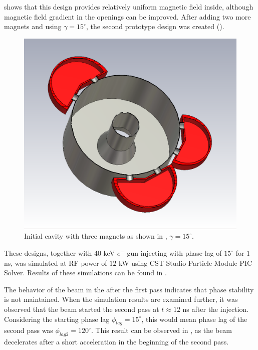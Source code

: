 \documentclass[a4paper,oneside,12pt]{report}
\numberwithin{equation}{chapter}
\begin{document}
 shows that this design provides relatively uniform magnetic field inside, although magnetic field gradient in the openings can be improved.
After adding two more magnets and using $\gamma=15^\circ$, the second prototype design was created ().

\vspace{20pt}
\begin{figure}[H]
    \centering
    \includegraphics[width=.6\linewidth]{./figures/cst/cst_second_design2.png}
    \vspace{0pt}
    \caption{Initial cavity with three magnets as shown in , $\gamma=15^\circ$.}
    \label{fig:initial_three_magnet_design}
    \vspace{-10pt}
\end{figure}

These designs, together with $40$ keV $e^-$ gun injecting with phase lag of $15^\circ$ for $1$ ns, was simulated at RF power of $12$ kW using CST Studio Particle Module PIC Solver.
Results of these simulations can be found in .

The behavior of the beam in the  after the first pass indicates that phase stability is not maintained. 
When the simulation results are examined further, it was observed that the beam started the second pass at $t \approx 12$ ns after the injection. 
Considering the starting phase lag $\phi_{lag}=15^\circ$, this would mean phase lag of the second pass was $\phi_{lag2}=120^\circ$.
This result can be observed in , as the beam decelerates after a short acceleration in the beginning of the second pass.
\end{document}
